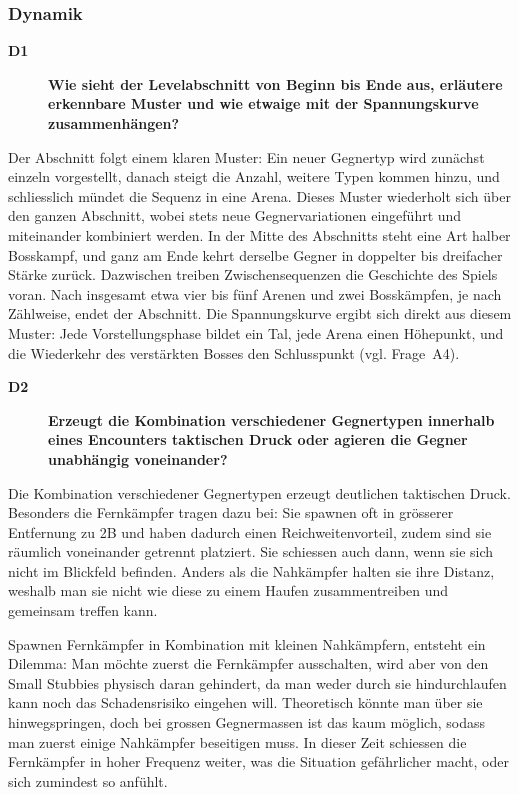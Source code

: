 \documentclass[../Main.tex]{subfiles}
\begin{document}
\subsubsection{Dynamik}

\begin{description}
  \item[\textbf{D1}] \textbf{Wie sieht der Levelabschnitt von Beginn bis Ende aus, erläutere erkennbare Muster und wie etwaige mit der Spannungskurve zusammenhängen?}
\end{description}

Der Abschnitt folgt einem klaren Muster: Ein neuer Gegnertyp wird zunächst einzeln vorgestellt, danach steigt die Anzahl, weitere Typen kommen hinzu, und schliesslich mündet die Sequenz in eine Arena. Dieses Muster wiederholt sich über den ganzen Abschnitt, wobei stets neue Gegnervariationen eingeführt und miteinander kombiniert werden. In der Mitte des Abschnitts steht eine Art halber Bosskampf, und ganz am Ende kehrt derselbe Gegner in doppelter bis dreifacher Stärke zurück. Dazwischen treiben Zwischensequenzen die Geschichte des Spiels voran. Nach insgesamt etwa vier bis fünf Arenen und zwei Bosskämpfen, je nach Zählweise, endet der Abschnitt. Die Spannungskurve ergibt sich direkt aus diesem Muster: Jede Vorstellungsphase bildet ein Tal, jede Arena einen Höhepunkt, und die Wiederkehr des verstärkten Bosses den Schlusspunkt (vgl. Frage~A4).

\begin{description}
  \item[\textbf{D2}] \textbf{Erzeugt die Kombination verschiedener Gegnertypen innerhalb eines Encounters taktischen Druck oder agieren die Gegner unabhängig voneinander?}
\end{description}

Die Kombination verschiedener Gegnertypen erzeugt deutlichen taktischen Druck. Besonders die Fernkämpfer tragen dazu bei: Sie spawnen oft in grösserer Entfernung zu 2B und haben dadurch einen Reichweitenvorteil, zudem sind sie räumlich voneinander getrennt platziert. Sie schiessen auch dann, wenn sie sich nicht im Blickfeld befinden. Anders als die Nahkämpfer halten sie ihre Distanz, weshalb man sie nicht wie diese zu einem Haufen zusammentreiben und gemeinsam treffen kann.

Spawnen Fernkämpfer in Kombination mit kleinen Nahkämpfern, entsteht ein Dilemma: Man möchte zuerst die Fernkämpfer ausschalten, wird aber von den Small Stubbies physisch daran gehindert, da man weder durch sie hindurchlaufen kann noch das Schadensrisiko eingehen will. Theoretisch könnte man über sie hinwegspringen, doch bei grossen Gegnermassen ist das kaum möglich, sodass man zuerst einige Nahkämpfer beseitigen muss. In dieser Zeit schiessen die Fernkämpfer in hoher Frequenz weiter, was die Situation gefährlicher macht, oder sich zumindest so anfühlt.
\end{document}
